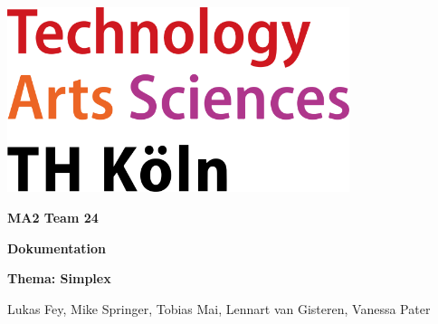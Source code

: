 \pagecolor{white}\afterpage{\nopagecolor}


\includegraphics[width=10cm]{images/TH_Koeln_Logo.svg.png}
\vspace{2in}

\fontsize{50}{50}\selectfont \textcolor{FSBlue}{\textbf{MA2 Team 24}}

\fontsize{30}{30}\selectfont \textcolor{FSBlue}{\textbf{Dokumentation}}

\vspace{10mm}
\LARGE\textcolor{FSBlue}{\textbf{Thema: Simplex}}

\vspace{0.5in}

\Large\textcolor{FSBlue}{Lukas Fey, Mike Springer, Tobias Mai, Lennart van Gisteren, Vanessa Pater}

\vspace{3in}



\thispagestyle{empty}
\restoregeometry   
\newpage